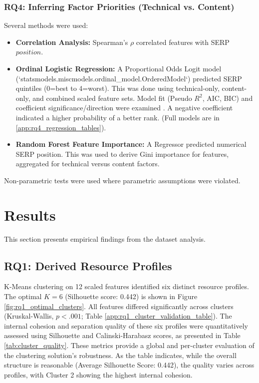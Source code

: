 \documentclass[a4paper,fleqn]{cas-sc}
\begin{document}
\subsubsection{RQ4: Inferring Factor Priorities (Technical vs. Content)}
\label{subsubsec:analysis_rq4}
Several methods were used:
\begin{itemize}
    \item \textbf{Correlation Analysis:} Spearman's $\rho$ correlated features with SERP $position$.
    \item \textbf{Ordinal Logistic Regression:} A Proportional Odds Logit model (`statsmodels.miscmodels.ordinal\_model.OrderedModel`) predicted SERP quintiles (0=best to 4=worst). This was done using technical-only, content-only, and combined scaled feature sets. Model fit (Pseudo $R^2$, AIC, BIC) and coefficient significance/direction were examined \citep{Nagpal2021, Toms2004}. A negative coefficient indicated a higher probability of a better rank. (Full models are in \ref{app:rq4_regression_tables}).
    \item \textbf{Random Forest Feature Importance:} A Regressor predicted numerical SERP position. This was used to derive Gini importance for features, aggregated for technical versus content factors.
\end{itemize}
Non-parametric tests were used where parametric assumptions were violated.

\section{Results}
\label{sec:results}
This section presents empirical findings from the dataset analysis.

\subsection{RQ1: Derived Resource Profiles}
\label{subsec:results_rq1}
K-Means clustering on 12 scaled features identified six distinct resource profiles. The optimal $K=6$ (Silhouette score: \num{0.442}) is shown in Figure \ref{fig:rq1_optimal_clusters}. All features differed significantly across clusters (Kruskal-Wallis, $p < .001$; Table \ref{app:rq1_cluster_validation_table}). The internal cohesion and separation quality of these six profiles were quantitatively assessed using Silhouette and Calinski-Harabasz scores, as presented in Table \ref{tab:cluster_quality}. These metrics provide a global and per-cluster evaluation of the clustering solution's robustness. As the table indicates, while the overall structure is reasonable (Average Silhouette Score: 0.442), the quality varies across profiles, with Cluster 2 showing the highest internal cohesion.
\end{document}
